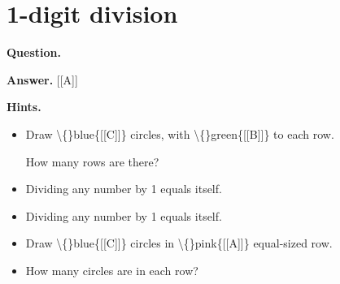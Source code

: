 \documentclass{article}
\begin{document}
\section*{1-digit division}
\textbf{Question.} 

\textbf{Answer.} [[A]]

\textbf{Hints.}
\begin{itemize}
  \item Draw \textbackslash\{\}blue\{[[C]]\} circles, with \textbackslash\{\}green\{[[B]]\} to each row.
                        
                        
                            
                            How many rows are there?
  \item Dividing any number by 1 equals itself.
  \item Dividing any number by 1 equals itself.
  \item Draw \textbackslash\{\}blue\{[[C]]\} circles in \textbackslash\{\}pink\{[[A]]\} equal-sized row.
  \item How many circles are in each row?
\end{itemize}
\end{document}
